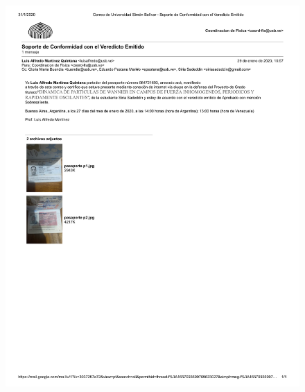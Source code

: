 
\begin{figure}
    \centering
    \includegraphics[width=1\columnwidth]{imagenes/SoportedeConformidadconelVeredictoEmitido.pdf}
\end{figure}
